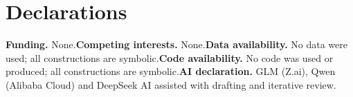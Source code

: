 \documentclass[10pt,twocolumn]{article}
\theoremstyle{definition}
\begin{document}
\section*{Declarations}

\textbf{Funding.} None.\quad \textbf{Competing interests.} None.\quad \textbf{Data availability.} No data were used; all constructions are symbolic.\quad \textbf{Code availability.} No code was used or produced; all constructions are symbolic.\quad \textbf{AI declaration.} GLM (Z.ai), Qwen (Alibaba Cloud) and DeepSeek AI assisted with drafting and iterative review.
\end{document}
